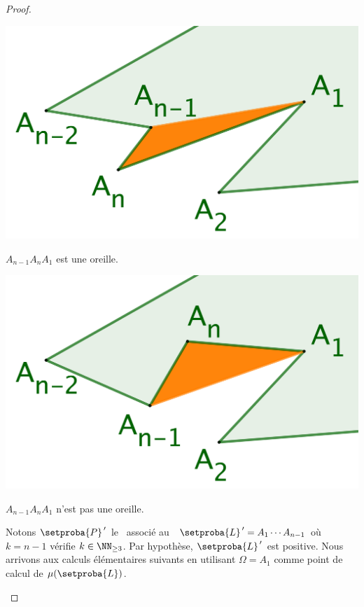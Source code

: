 \begin{proof}
\begin{itemize}
	    \begin{multicols}{2}
    	    \small\itshape
    		\begin{center}
        	\includegraphics[scale=.4]{content/polygon/at-least-one/triangulation-proof-OK.png}

	        	\smallskip
    	   		$A_{n-1} A_n A_1$ est une oreille.
    	\end{center}

	    	\begin{center}
        	\includegraphics[scale=.4]{content/polygon/at-least-one/triangulation-proof-KO.png}

        		\smallskip
    	   		$A_{n-1} A_n A_1$ n'est pas une oreille.
    		\end{center}
    	\end{multicols}


		\noindent
		Notons $\setproba{P}^{\,\prime}$ le \kgone\ associé au \kcycle\ $\setproba{L}^{\,\prime} = A_1 \cdots A_{n-1}$ où $k = n-1$ vérifie $k \in \NN_{\geq3}$. Par hypothèse, $\setproba{L}^{\,\prime}$ est positive. Nous arrivons aux calculs élémentaires suivants en utilisant $\Omega = A_1$ comme point de calcul de $\mu(\setproba{L})$.


\end{itemize}
\end{proof}
